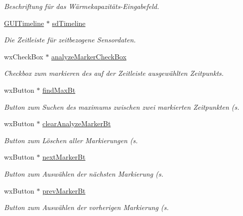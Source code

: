 \begin{DoxyCompactItemize}
\begin{DoxyCompactList}\small\item\em Beschriftung für das Wärmekapazitäts-\/\-Eingabefeld. \end{DoxyCompactList}\item 
\hyperlink{classGUITimeline}{G\-U\-I\-Timeline} $\ast$ \hyperlink{classPropertiesBox_ab145e0c36e99d355f2722964da46b31a}{sd\-Timeline}
\begin{DoxyCompactList}\small\item\em Die Zeitleiste für zeitbezogene Sensordaten. \end{DoxyCompactList}\item 
wx\-Check\-Box $\ast$ \hyperlink{classPropertiesBox_a20498b8540b84cc8f4e691aa57c7a7c3}{analyze\-Marker\-Check\-Box}
\begin{DoxyCompactList}\small\item\em Checkbox zum markieren des auf der Zeitleiste ausgewählten Zeitpunkts. \end{DoxyCompactList}\item 
wx\-Button $\ast$ \hyperlink{classPropertiesBox_af03e4a7248c0cb91f3978eadc0936c61}{find\-Max\-Bt}
\begin{DoxyCompactList}\small\item\em Button zum Suchen des maximums zwischen zwei markierten Zeitpunkten (s. \end{DoxyCompactList}\item 
wx\-Button $\ast$ \hyperlink{classPropertiesBox_a93a88ce0e08aee33673b26ae63c7846f}{clear\-Analyze\-Marker\-Bt}
\begin{DoxyCompactList}\small\item\em Button zum Löschen aller Markierungen (s. \end{DoxyCompactList}\item 
wx\-Button $\ast$ \hyperlink{classPropertiesBox_ad4a347a273ab780cf1ab941a5cf6d4b0}{next\-Marker\-Bt}
\begin{DoxyCompactList}\small\item\em Button zum Auswählen der nächsten Markierung (s. \end{DoxyCompactList}\item 
wx\-Button $\ast$ \hyperlink{classPropertiesBox_ab315d0ce0bda89ebe2c003d141df2891}{prev\-Marker\-Bt}
\begin{DoxyCompactList}\small\item\em Button zum Auswählen der vorherigen Markierung (s. \end{DoxyCompactList}\item 

\end{DoxyCompactItemize}
